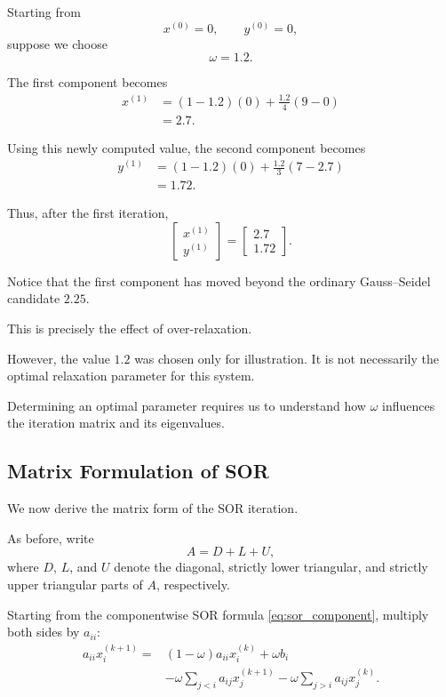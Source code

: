 \documentclass[11pt,a4paper]{article}
\theoremstyle{definition}
\theoremstyle{remark}
\begin{document}
Starting from
\[
    x^{(0)}=0,
    \qquad
    y^{(0)}=0,
\]
suppose we choose
\[
    \omega=1.2.
\]

The first component becomes
\[
\begin{aligned}
x^{(1)}
&=
(1-1.2)(0)
+
\frac{1.2}{4}(9-0)
\\
&=2.7.
\end{aligned}
\]

Using this newly computed value,
the second component becomes
\[
\begin{aligned}
y^{(1)}
&=
(1-1.2)(0)
+
\frac{1.2}{3}(7-2.7)
\\
&=1.72.
\end{aligned}
\]

Thus, after the first iteration,
\[
    \boxed{
    \begin{bmatrix}
        x^{(1)}\\y^{(1)}
    \end{bmatrix}
    =
    \begin{bmatrix}
        2.7\\1.72
    \end{bmatrix}.
    }
\]

Notice that the first component
has moved beyond the ordinary
Gauss--Seidel candidate $2.25$.

This is precisely the effect
of over-relaxation.

However, the value $1.2$ was
chosen only for illustration.
It is not necessarily the
optimal relaxation parameter
for this system.

Determining an optimal parameter
requires us to understand how
$\omega$ influences the
iteration matrix and its
eigenvalues.


\subsection{Matrix Formulation of SOR}

We now derive the matrix form
of the SOR iteration.

As before, write
\[
    A=D+L+U,
\]
where $D$, $L$, and $U$
denote the diagonal, strictly
lower triangular, and strictly
upper triangular parts of $A$,
respectively.

Starting from the componentwise
SOR formula
\eqref{eq:sor_component},
multiply both sides by $a_{ii}$:
\[
\begin{aligned}
a_{ii}x_i^{(k+1)}
={}&
(1-\omega)a_{ii}x_i^{(k)}
+\omega b_i
\\
&-
\omega\sum_{j<i}
a_{ij}x_j^{(k+1)}
-
\omega\sum_{j>i}
a_{ij}x_j^{(k)}.
\end{aligned}
\]
\end{document}
